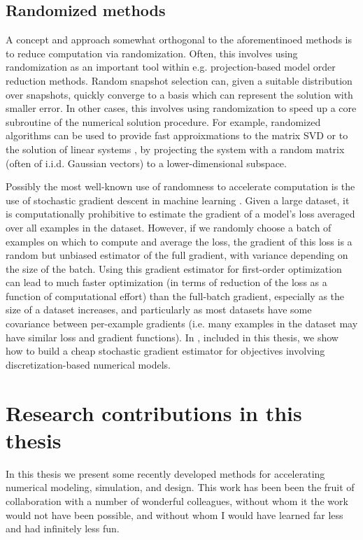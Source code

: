 \documentclass{puthesis}
\begin{document}
\subsection{Randomized methods}
A concept and approach somewhat orthogonal to the aforementinoed methods
is to reduce computation via randomization.
Often, this involves using randomization as an important tool within e.g.
projection-based model order reduction methods.
Random snapshot selection can, given a suitable distribution over snapshots, quickly
converge to a basis which can represent the solution with smaller error.
In other cases, this involves using randomization to speed up a core subroutine of
the numerical solution procedure.
For example, randomized algorithms can be used to provide fast approixmations to the
matrix SVD or to the solution of linear systems
\citep{drineas2006fast,drineas2016randnla}, by projecting the system with a
random matrix (often of i.i.d. Gaussian vectors) to a lower-dimensional subspace.

Possibly the most well-known use of randomness to accelerate computation is the use
of stochastic gradient descent in machine learning
\citep{robbins1951stochastic,bottou2010large}.
Given a large dataset, it is computationally prohibitive to estimate the gradient of a
model's loss averaged over all examples in the dataset.
However, if we randomly choose a batch of examples on which to compute and average
the loss, the gradient of this loss is a random but unbiased estimator of the full
gradient, with variance depending on the size of the batch.
Using this gradient estimator for first-order optimization can lead to much faster
optimization (in terms of reduction of the loss as a function of computational effort)
than the full-batch gradient, especially as the size of a dataset increases, and
particularly as most datasets have some covariance between per-example gradients
(i.e. many examples in the dataset may have similar loss and gradient functions).
In \citep{beatson2019efficient}, included in this thesis, we show how to
build a cheap stochastic gradient estimator for objectives involving
discretization-based numerical models.

\section{Research contributions in this thesis}

In this thesis we present some recently developed methods for accelerating
numerical modeling, simulation, and design.
This work has been been the fruit of collaboration with a number of wonderful
colleagues, without whom it the work would not have been possible, and without whom
I would have learned far less and had infinitely less fun.
\end{document}
